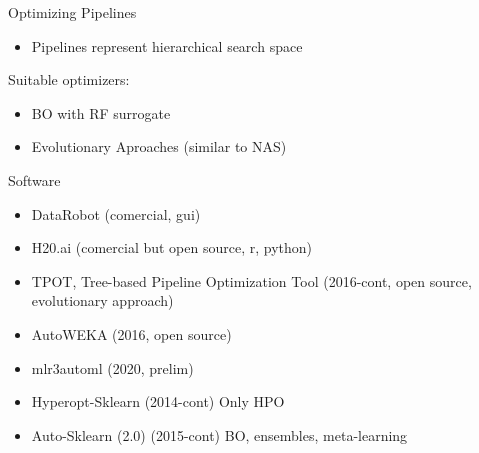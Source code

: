 \begin{frame}{Optimizing Pipelines}
  \begin{itemize}
    \item Pipelines represent hierarchical search space
  \end{itemize}

  Suitable optimizers:
  \begin{itemize}
    \item BO with RF surrogate
    \item Evolutionary Aproaches (similar to NAS)
  \end{itemize}
    
\end{frame}

\begin{frame}{Software}

\begin{itemize}
  \item DataRobot (comercial, gui)
  \item H20.ai (comercial but open source, r, python)
  \item TPOT, Tree-based Pipeline Optimization Tool  (2016-cont, open source, evolutionary approach) %
  \item AutoWEKA (2016, open source)
  \item mlr3automl (2020, prelim)
  \item Hyperopt-Sklearn (2014-cont) Only HPO
  \item Auto-Sklearn (2.0) (2015-cont) BO, ensembles, meta-learning
\end{itemize}

\end{frame}




